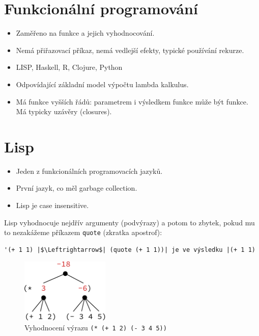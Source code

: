 \documentclass{szzclass}
\begin{document}
\tableofcontents
\newpage

\section{Funkcionální programování}
\begin{itemize}
\item Zaměřeno na funkce a jejich vyhodnocování.
\item Nemá přiřazovací příkaz, nemá vedlejší efekty, typické používání rekurze.
\item LISP, Haskell, R, Clojure, Python
\item Odpovídající základní model výpočtu lambda kalkulus.
\item Má funkce vyšších řádů: parametrem i výsledkem funkce může být funkce. Má typicky uzávěry (closures).
\end{itemize}

\section{Lisp}
\begin{itemize}
\item Jeden z funkcionálních programovacích jazyků.
\item První jazyk, co měl garbage collection.
\item Lisp je case insensitive.
\end{itemize}

Lisp vyhodnocuje nejdřív argumenty (podvýrazy) a potom to zbytek, pokud mu to nezakážeme příkazem \texttt{quote} (zkratka apostrof):
\begin{verbatim}
'(+ 1 1) |$\Leftrightarrow$| (quote (+ 1 1))| je ve výsledku |(+ 1 1)
\end{verbatim}

\begin{figure}[H]
  \centering
  \includegraphics[width=4.2cm]{topics/bi-wsi-si-15/images/eval-tree}
  \caption{Vyhodnocení výrazu \texttt{(* (+ 1 2) (- 3 4 5))}}
\end{figure}
\end{document}
